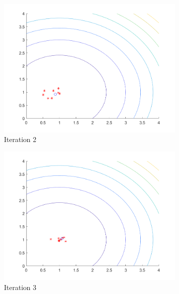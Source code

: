 \begin{figure}
\begin{subfigure}[b]{0.4\textwidth}
    \includegraphics[width=\textwidth]{img/pa/hunting_ex/hunt-iter-2}
    \caption{Iteration 2}
    \label{fig:hnt-iter-2}
  \end{subfigure}
  \begin{subfigure}[b]{0.4\textwidth}
    \includegraphics[width=\textwidth]{img/pa/hunting_ex/hunt-iter-3}
    \caption{Iteration 3}
    \label{fig:hnt-iter-3}
  \end{subfigure}
  \begin{subfigure}[b]{0.4\textwidth}

\end{subfigure}
\end{figure}
